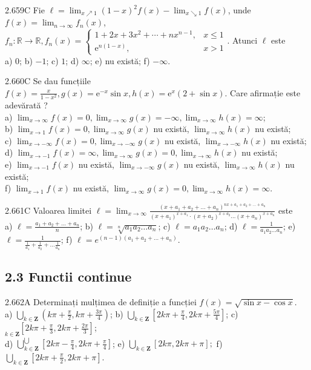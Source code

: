 \documentclass[11pt]{article}
\begin{document}
2.659C Fie $\ell=\lim _{x \nearrow 1}(1-x)^{2} f(x)-\lim _{x \searrow 1} f(x)$, unde $f(x)=\lim _{n \rightarrow \infty} f_{n}(x)$, $f_{n}: \mathbb{R} \rightarrow \mathbb{R}, f_{n}(x)= \begin{cases}1+2 x+3 x^{2}+\cdots+n x^{n-1}, & x \leq 1 \\ \mathrm{e}^{n(1-x)}, & x>1\end{cases}$. Atunci $\ell$ este\\ a) $0$; b) $-1$; c) $1$; d) $\infty$; e) nu există; f) $-\infty$.

2.660C Se dau funcțiile $f(x)=\frac{x}{1-x^{2}}, g(x)=\mathrm{e}^{-x} \sin x, h(x)=\mathrm{e}^{x}(2+\sin x)$. Care afirmație este adevărată ?\\ a) $\lim _{x \rightarrow \infty} f(x)=0, \lim _{x \rightarrow \infty} g(x)=-\infty, \lim _{x \rightarrow \infty} h(x)=\infty$;\\ b) $\lim _{x \rightarrow 1} f(x)=0, \lim _{x \rightarrow \infty} g(x)$ nu există, $\lim _{x \rightarrow \infty} h(x)$ nu există;\\ c) $\lim _{x \rightarrow-\infty} f(x)=0, \lim _{x \rightarrow-\infty} g(x)$ nu există, $\lim _{x \rightarrow-\infty} h(x)$ nu există;\\ d) $\lim _{x \rightarrow-1} f(x)=\infty, \lim _{x \rightarrow \infty} g(x)=0, \lim _{x \rightarrow \infty} h(x)$ nu există;\\ e) $\lim _{x \rightarrow-1} f(x)$ nu există, $\lim _{x \rightarrow-\infty} g(x)$ nu există, $\lim _{x \rightarrow \infty} h(x)$ nu există;\\ f) $\lim _{x \rightarrow 1} f(x)$ nu există, $\lim _{x \rightarrow \infty} g(x)=0, \lim _{x \rightarrow \infty} h(x)=\infty$.

2.661C Valoarea limitei $\ell=\lim _{x \rightarrow \infty} \frac{\left(x+a_{1}+a_{2}+\ldots+a_{n}\right)^{n x+a_{1}+a_{2}+\ldots+a_{n}}}{\left(x+a_{1}\right)^{x+a_{1}} \cdot\left(x+a_{2}\right)^{x+a_{2}} \ldots\left(x+a_{n}\right)^{x+a_{n}}}$ este\\ a) $\ell=\frac{a_{1}+a_{2}+\ldots+a_{n}}{n}$; b) $\ell=\sqrt[n]{a_{1} a_{2} \ldots a_{n}}$; c) $\ell=a_{1} a_{2} \ldots a_{n}$; d) $\ell=\frac{1}{a_{1} a_{2} \ldots a_{n}}$; e) $\ell=\frac{1}{\frac{1}{a_{1}}+\frac{1}{a_{2}}+\ldots \frac{1}{a_{n}}}$; f) $\ell=e^{(n-1)\left(a_{1}+a_{2}+\ldots+a_{n}\right)}$.

\subsection*{2.3 Functii continue}
2.662A Determinați mulțimea de definiție a funcției $f(x)=\sqrt{\sin x-\cos x}$.\\ a) $\bigcup_{k \in \mathbf{Z}}\left(k \pi+\frac{\pi}{2}, k \pi+\frac{3 \pi}{4}\right)$; b) $\bigcup_{k \in \mathbf{Z}}\left[2 k \pi+\frac{\pi}{4}, 2 k \pi+\frac{5 \pi}{4}\right]$; c) $\underset{k \in \mathbf{Z}}{ }\left[2 k \pi+\frac{\pi}{3}, 2 k \pi+\frac{2 \pi}{3}\right]$;\\ d) $\bigcup_{k \in \mathbf{Z}}^{\bigcup}\left[2 k \pi-\frac{\pi}{4}, 2 k \pi+\frac{\pi}{4}\right]$; e) $\bigcup_{k \in \mathbf{Z}}[2 k \pi, 2 k \pi+\pi] ;$ f) $\bigcup_{k \in \mathbf{Z}}\left[2 k \pi+\frac{\pi}{2}, 2 k \pi+\pi\right]$.
\end{document}
